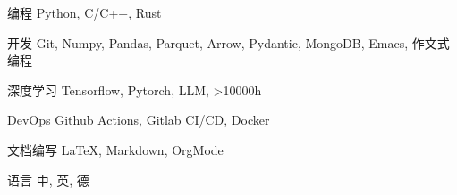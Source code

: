 \documentclass[../cv_cn.tex]{subfiles}
\begin{document}


\begin{cvskills}

  \cvskill
    {编程} %
    {Python, C/C++, Rust} %

  \cvskill
    {开发} %
    {Git, Numpy, Pandas, Parquet, Arrow, Pydantic, MongoDB, Emacs, 作文式编程} %

  \cvskill
    {深度学习} %
    {Tensorflow, Pytorch, LLM, >10000h} %

  \cvskill
    {DevOps} %
    {Github Actions, Gitlab CI/CD, Docker} %

  \cvskill
    {文档编写} %
    {LaTeX, Markdown, OrgMode} %

  \cvskill
    {语言} %
    {中, 英, 德} %

\end{cvskills}
\end{document}

